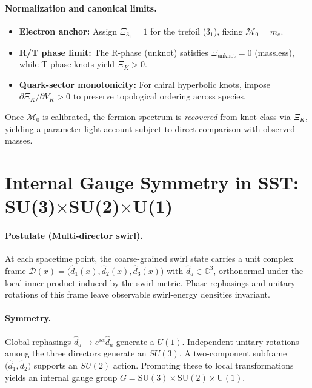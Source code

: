 \documentclass[10pt,reprint,aps,onecolumn,nofootinbib]{revtex4-2}
\begin{document}
        \paragraph{Normalization and canonical limits.}
            \begin{itemize}
            \item \textbf{Electron anchor:} Assign $\Xi_{3_1}=1$ for the trefoil ($3_1$), fixing $\mathcal{M}_0=m_e$.
            \item \textbf{R/T phase limit:} The R-phase (unknot) satisfies $\Xi_{\mathrm{unknot}}=0$ (massless), while T-phase knots yield $\Xi_K>0$.
            \item \textbf{Quark-sector monotonicity:} For chiral hyperbolic knots, impose $\partial \Xi_K/\partial V_K>0$ to preserve topological ordering across species.
            \end{itemize}
            Once $\mathcal{M}_0$ is calibrated, the fermion spectrum is \emph{recovered} from knot class via $\Xi_K$, yielding a parameter-light account subject to direct comparison with observed masses.



\section{Internal Gauge Symmetry in SST: SU(3)\texorpdfstring{$\times$}{×}SU(2)\texorpdfstring{$\times$}{×}U(1)}
\label{sec:SST-gauge}

\paragraph{Postulate (Multi-director swirl).}
    At each spacetime point, the coarse-grained swirl state carries a unit complex frame
    $\mathcal{D}(x) = \big( \hat{d}_1(x), \hat{d}_2(x), \hat{d}_3(x) \big)$
    with $\hat{d}_a \in \mathbb{C}^3$, orthonormal under the local inner product induced by the swirl metric.
    Phase rephasings and unitary rotations of this frame leave observable swirl-energy densities invariant.

\paragraph{Symmetry.}
    Global rephasings $\hat{d}_a \!\to\! e^{i\alpha}\hat{d}_a$ generate a $U(1)$.
    Independent unitary rotations among the three directors generate an $SU(3)$.
    A two-component subframe $\big(\hat{d}_1,\hat{d}_2\big)$ supports an $SU(2)$ action.
    Promoting these to local transformations yields an internal gauge group
    $G=\mathrm{SU(3)}\times\mathrm{SU(2)}\times\mathrm{U(1)}$.
\end{document}
